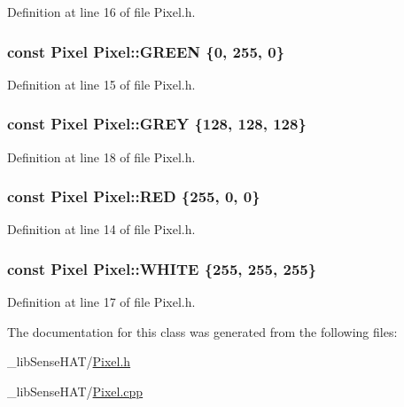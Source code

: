 Definition at line 16 of file Pixel.\+h.

\subsubsection[{\texorpdfstring{G\+R\+E\+EN}{GREEN}}]{\setlength{\rightskip}{0pt plus 5cm}const {\bf Pixel} Pixel\+::\+G\+R\+E\+EN \{0, 255, 0\}\hspace{0.3cm}{\ttfamily [static]}}\hypertarget{class_pixel_af1e95f87b82dedb916c81f427b3eb68a}{}\label{class_pixel_af1e95f87b82dedb916c81f427b3eb68a}


Definition at line 15 of file Pixel.\+h.

\subsubsection[{\texorpdfstring{G\+R\+EY}{GREY}}]{\setlength{\rightskip}{0pt plus 5cm}const {\bf Pixel} Pixel\+::\+G\+R\+EY \{128, 128, 128\}\hspace{0.3cm}{\ttfamily [static]}}\hypertarget{class_pixel_a67edde6c97818a595235295f750b50fd}{}\label{class_pixel_a67edde6c97818a595235295f750b50fd}


Definition at line 18 of file Pixel.\+h.

\subsubsection[{\texorpdfstring{R\+ED}{RED}}]{\setlength{\rightskip}{0pt plus 5cm}const {\bf Pixel} Pixel\+::\+R\+ED \{255, 0, 0\}\hspace{0.3cm}{\ttfamily [static]}}\hypertarget{class_pixel_a0873aef3100f5b2400ee7ca185bf263a}{}\label{class_pixel_a0873aef3100f5b2400ee7ca185bf263a}


Definition at line 14 of file Pixel.\+h.

\subsubsection[{\texorpdfstring{W\+H\+I\+TE}{WHITE}}]{\setlength{\rightskip}{0pt plus 5cm}const {\bf Pixel} Pixel\+::\+W\+H\+I\+TE \{255, 255, 255\}\hspace{0.3cm}{\ttfamily [static]}}\hypertarget{class_pixel_a12c08beec64c8d57bdd9ef3b49244aa3}{}\label{class_pixel_a12c08beec64c8d57bdd9ef3b49244aa3}


Definition at line 17 of file Pixel.\+h.



The documentation for this class was generated from the following files\+:\begin{DoxyCompactItemize}
\item 
\+\_\+lib\+Sense\+H\+A\+T/\hyperlink{_pixel_8h}{Pixel.\+h}\item 
\+\_\+lib\+Sense\+H\+A\+T/\hyperlink{_pixel_8cpp}{Pixel.\+cpp}\end{DoxyCompactItemize}
